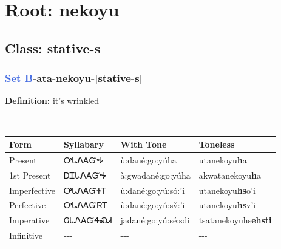\needspace{4in}
\section*{Root: nekoyu}
\nopagebreak
{}
\needspace{3in}
\subsection*{Class: stative-s}
\nopagebreak
\needspace{2in}
\subsubsection*{\textcolor{RoyalBlue}{Set B}{-}ata{-}\textbf{nekoyu}{-}[stative-s]}
\nopagebreak
\textbf{Definition: } it{\textquoteright}s wrinkled
\\[0.5em]
\begin{tabularx}{\textwidth}{l X X X}%
\toprule%
\textbf{Form}&\textbf{Syllabary}&\textbf{With Tone}&\textbf{Toneless}\\%
\midrule%
Present&ᎤᏓᏁᎪᏳᎭ&ù:dané:go:yúha&utanekoyu\textbf{h}a\\%
1st Present&ᎠᏆᏓᏁᎪᏳᎭ&à:gwadané:go:yúha&akwatanekoyu\textbf{h}a\\%
Imperfective&ᎤᏓᏁᎪᏳᏐᎢ&ù:dané:go:yú:só:’i&utanekoyu\textbf{hs}o'i\\%
Perfective&ᎤᏓᏁᎪᏳᏒᎢ&ù:dané:go:yú:sv̌:’i&utanekoyu\textbf{hs}v'i\\%
Imperative&ᏣᏓᏁᎪᏳᏎᏍᏗ&jadané:go:yú:sé:sdi&tsatanekoyuhs\textbf{ehsti}\\%
Infinitive&{-}{-}{-}&{-}{-}{-}&{-}{-}{-}\\%
\bottomrule%
\end{tabularx}
\\[1em]